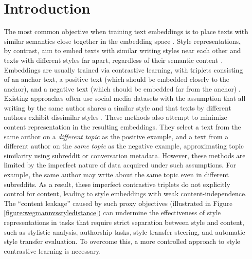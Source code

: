 \section{Introduction}
\label{sec:introduction}

The most common objective when training text embeddings is to place texts with similar semantics close together in the embedding space \citep{sentencetransformers}. Style representations, by contrast, aim to embed texts with similar writing styles near each other and texts with different styles far apart, regardless of their semantic content \citep{styleemb}. Embeddings are usually trained via contrastive learning, with triplets consisting of an anchor text, a positive text (which should be embedded closely to the anchor), and a negative text (which should be embedded far from the anchor) \citep{contrastive1, contrastive2, tripletloss}. Existing approaches often use social media datasets with the assumption that all writing by the same author shares a similar style and that texts by different authors exhibit dissimilar styles \citep{styleemb}. These methods also attempt to minimize content representation in the resulting embeddings. They select a text from the same author on a \textit{different topic} as the positive example, and a text from a different author on the \textit{same topic} as the negative example, approximating topic similarity using subreddit or conversation metadata. However, these methods are limited by the imperfect nature of data acquired under such assumptions. For example, the same author may write about the same topic even in different subreddits. As a result, these imperfect contrastive triplets do not explicitly control for content, leading to style embeddings with weak content-independence.
The ``content leakage'' caused by such proxy objectives (illustrated in Figure \ref{figure:wegmannvsstyledistance}) can undermine the effectiveness of style representations in tasks that require strict separation between style and content, such as stylistic analysis, authorship tasks, style transfer steering, and automatic style transfer evaluation. To overcome this, a more controlled approach to style contrastive learning is necessary.

